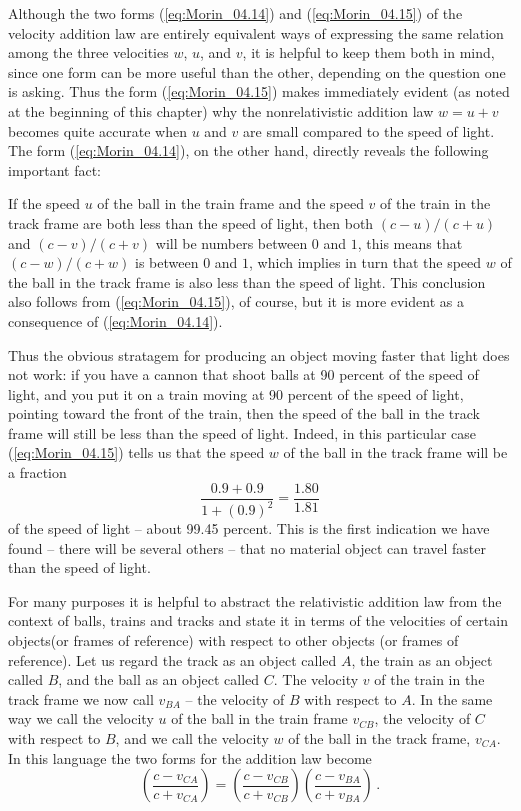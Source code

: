 Although the two forms (\ref{eq:Morin_04.14}) and (\ref{eq:Morin_04.15}) of the velocity addition law are entirely equivalent ways of expressing the same relation among the three velocities $w$, $u$, and $v$, it is helpful to keep them both in mind, since one form can be more useful than the other, depending on the question one is asking. Thus the form (\ref{eq:Morin_04.15}) makes immediately evident (as noted at the beginning of this chapter) why the nonrelativistic addition law $w = u + v$ becomes quite accurate when $u$ and $v$ are small compared to the speed of light. The form (\ref{eq:Morin_04.14}), on the other hand, directly reveals the following important fact:

If the speed $u$ of the ball in the train frame and the speed $v$ of the train in the track frame are both less than the speed of light, then both $(c - u)/(c + u)$ and $(c - v)/(c + v)$ will be numbers between $0$ and $1$, this means that $(c - w)/(c + w)$ is between $0$ and $1$, which implies in turn that the speed $w$ of the ball in the track frame is also less than the speed of light. This conclusion also follows from (\ref{eq:Morin_04.15}), of course, but it is more evident as a consequence of (\ref{eq:Morin_04.14}).

Thus the obvious stratagem for producing an object moving faster that light does not work: if you have a cannon that shoot balls at 90 percent of the speed of light, and you put it on a train moving at 90 percent of the speed of light, pointing toward the front of the train, then the speed of the ball in the track frame will still be less than the speed of light. Indeed, in this particular case (\ref{eq:Morin_04.15}) tells us that the speed $w$ of the ball in the track frame will be a fraction 
$$\frac{0.9 + 0.9} {1 + (0.9)^2} = \frac{1.80}{1.81}$$ of the speed of light -- about 99.45 percent. This is the first indication we have found -- there will be several others -- that no material object can travel faster than the speed of light.

For many purposes it is helpful to abstract the relativistic addition law from the context of balls, trains and tracks and state it in terms of the velocities of certain objects(or frames of reference) with respect to other objects (or frames of reference). Let us regard the track as an object called $A$, the train as an object called $B$, and the ball as an object called $C$. The velocity $v$ of the train in the track frame we now call $v_{BA}$ -- the velocity of $B$ with respect to $A$. In the same way we call the velocity $u$ of the ball in the train frame $v_{CB}$, the velocity of $C$ with respect to $B$, and we call the velocity $w$ of the ball in the track frame, $v_{CA}$. In this language the two forms for the addition law become 
\begin{equation}\label{eq:Morin_04.16}
\left( \frac{c - v_{CA}}{c + v_{CA}} \right) = \left( \frac{c - v_{CB}}{c + v_{CB}} \right)  \left( \frac{c - v_{BA}}{c + v_{BA}} \right)\,.
\end{equation}

